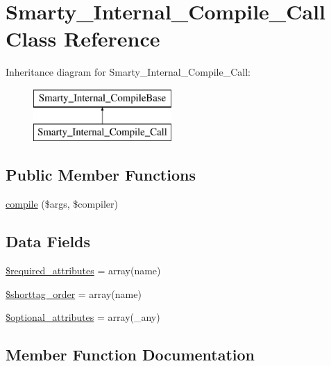 \hypertarget{class_smarty___internal___compile___call}{}\section{Smarty\+\_\+\+Internal\+\_\+\+Compile\+\_\+\+Call Class Reference}
\label{class_smarty___internal___compile___call}
Inheritance diagram for Smarty\+\_\+\+Internal\+\_\+\+Compile\+\_\+\+Call\+:\begin{figure}[H]
\begin{center}
\leavevmode
\includegraphics[height=2.000000cm]{class_smarty___internal___compile___call}
\end{center}
\end{figure}
\subsection*{Public Member Functions}
\begin{DoxyCompactItemize}
\item 
\hyperlink{class_smarty___internal___compile___call_ad72fac0effa74aadee9b5ef6aed5f69f}{compile} (\$args, \$compiler)
\end{DoxyCompactItemize}
\subsection*{Data Fields}
\begin{DoxyCompactItemize}
\item 
\hyperlink{class_smarty___internal___compile___call_ae799507d5461de485f3a618abeecea95}{\$required\+\_\+attributes} = array(\textquotesingle{}name\textquotesingle{})
\item 
\hyperlink{class_smarty___internal___compile___call_a2ccb25269c3a92e8c4796c7ef23725e6}{\$shorttag\+\_\+order} = array(\textquotesingle{}name\textquotesingle{})
\item 
\hyperlink{class_smarty___internal___compile___call_a899d1eb4a6fecbd6ce696adb171c80a4}{\$optional\+\_\+attributes} = array(\textquotesingle{}\+\_\+any\textquotesingle{})
\end{DoxyCompactItemize}


\subsection{Member Function Documentation}
\hypertarget{class_smarty___internal___compile___call_ad72fac0effa74aadee9b5ef6aed5f69f}{}
